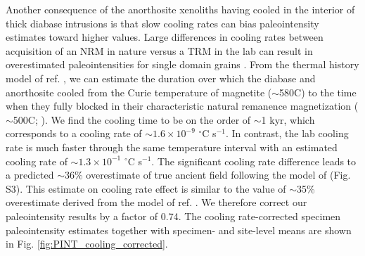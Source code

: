 \documentclass[9pt,twocolumn,twoside,lineno]{pnas-new}
\begin{document}
Another consequence of the anorthosite xenoliths having cooled in the interior of thick diabase intrusions is that slow cooling rates can bias paleointensity estimates toward higher values. Large differences in cooling rates between acquisition of an NRM in nature versus a TRM in the lab can result in overestimated paleointensities for single domain grains \cite{Dodson1980a, Halgedahl1980a, Nagy2021a}. From the thermal history model of ref.  \citealp{Zhang2021b}, we can estimate the duration over which the diabase and anorthosite cooled from the Curie temperature of magnetite ($\sim$580\textdegree C) to the time when they fully blocked in their characteristic natural remanence magnetization ($\sim$500\textdegree C;  \citealp{Zhang2021b}). We find the cooling time to be on the order of $\sim$1 kyr, which corresponds to a cooling rate of $\sim1.6\times10^{-9}$ $^\circ$C s$^{-1}$. In contrast, the lab cooling rate is much faster through the same temperature interval with an estimated cooling rate of $\sim1.3\times10^{-1}$ $^\circ$C s$^{-1}$. The significant cooling rate difference leads to a predicted $\sim$36\% overestimate of true ancient field following the model of \citealp{Halgedahl1980a} (Fig. S3). This estimate on cooling rate effect is similar to the value of $\sim$35\% overestimate derived from the model of ref. \citealp{Nagy2021a}. We therefore correct our paleointensity results by a factor of 0.74. The cooling rate-corrected specimen paleointensity estimates together with specimen- and site-level means are shown in Fig. \ref{fig:PINT_cooling_corrected}.
\end{document}

